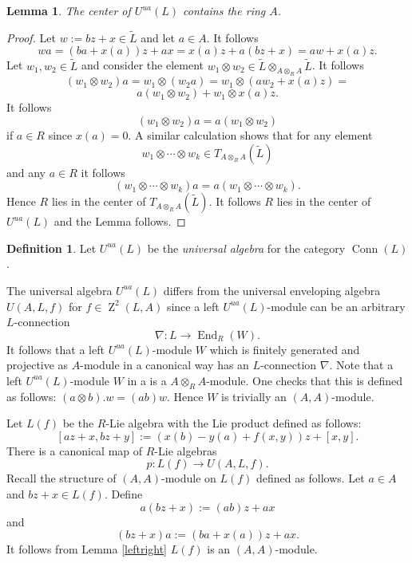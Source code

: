 \documentclass{amsart}
\theoremstyle{plain}
\newtheorem{lemma}[theorem]{Lemma}
\theoremstyle{definition}
\newtheorem{definition}[theorem]{Definition}
\theoremstyle{remark}
\numberwithin{equation}{theorem}
\begin{document}
\begin{lemma} \label{center} The center of ${U^{ua}}(L)$  contains the ring $A$.
\end{lemma}
\begin{proof} Let $w:=bz+x\in {\tilde{L} }$ and let $a\in {A}$. It follows 
\[ wa=(ba+x(a))z+ax=x(a)z+a(bz+x)=aw+x(a)z.\]
Let $w_1,w_2\in {\tilde{L} }$ and consider the element $w_1\otimes w_2\in {\tilde{L} }\otimes_{{A}\otimes_{R} {A}}{\tilde{L} }$.  It follows
\[ (w_1\otimes w_2)a=w_1\otimes (w_2a)=w_1\otimes (aw_2+x(a)z)=\]
\[ a(w_1\otimes w_2)+ w_1\otimes x(a)z .\]
It follows 
\[ (w_1\otimes w_2)a=a(w_1\otimes w_2)\]
if $a\in {R}$ since $x(a)=0$. A similar calculation shows that for any element
\[ w_1\otimes \cdots \otimes w_k \in T_{{A}\otimes_{R} {A}}({\tilde{L} })\]
and any $a\in {R}$ it follows 
\[ (w_1\otimes \cdots \otimes w_k)a=a(w_1\otimes \cdots \otimes w_k).\]
Hence ${R}$ lies in the center of $T_{{A}\otimes_{R} {A}}({\tilde{L} })$. It follows ${R}$ lies in the center of ${U^{ua}}(L)$ and the Lemma
follows.
\end{proof}

\begin{definition} Let ${U^{ua}}(L)$ be the \emph{universal algebra} for the category ${\operatorname{Conn}}(L)$.
\end{definition}

The universal algebra ${U^{ua}}(L)$ differs from the universal enveloping algebra $U({A},L,f)$ for $f\in {\operatorname{Z}}^2(L,{A})$
since a left ${U^{ua}}(L)$-module can be an arbitrary $L$-connection
\[ \nabla:L\rightarrow {\operatorname{End} }_{R}(W).\]
It follows that a left ${U^{ua}}(L)$-module $W$ which is finitely 
generated and projective as ${A}$-module
in a canonical way has an $L$-connection $\nabla$. Note that a left ${U^{ua}}(L)$-module $W$ in a is a ${A}\otimes_{R} {A}$-module.
One checks that this is defined as follows: $(a\otimes b).w=(ab)w$. Hence $W$ is trivially an $({A},{A})$-module.

Let $L(f)$ be the ${R}$-Lie algebra with the Lie product defined as follows:
\[ [az+x, bz+y]:=(x(b)-y(a)+f(x,y))z+[x,y].\]
There is a canonical map of ${R}$-Lie algebras
\[ p:L(f)\rightarrow U({A},L,f).\]
Recall the structure of $({A},{A})$-module on $L(f)$ defined as follows. Let $a\in {A}$ and $bz+x\in L(f)$.
Define
\[ a(bz+x):=(ab)z+ax \]
and
\[ (bz+x)a:=(ba+x(a))z+ax.\]
It follows from Lemma \ref{leftright} $L(f)$ is an $({A},{A})$-module.
\end{document}
